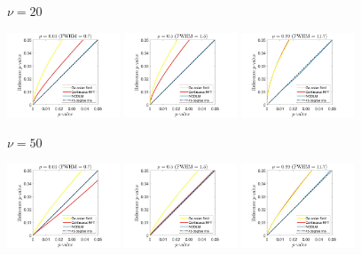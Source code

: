 \documentclass{article}
\begin{document}
\begin{figure}[!htp]
\centering
\begin{sideways}
\phantom{------------------}$\nu = 20$
\end{sideways}
\includegraphics[trim=70 5 100 5, clip,width=0.3\textwidth]{figure/2D_nu20_rho0.01.jpg}
\includegraphics[trim=70 5 100 5, clip,width=0.3\textwidth]{figure/2D_nu20_rho0.5.jpg}
\includegraphics[trim=70 5 100 5, clip,width=0.3\textwidth]{figure/2D_nu20_rho0.99.jpg}

\begin{sideways}
\phantom{------------------}$\nu = 50$
\end{sideways}
\includegraphics[trim=70 5 100 5, clip,width=0.3\textwidth]{figure/2D_nu50_rho0.01.jpg}
\includegraphics[trim=70 5 100 5, clip,width=0.3\textwidth]{figure/2D_nu50_rho0.5.jpg}
\includegraphics[trim=70 5 100 5, clip,width=0.3\textwidth]{figure/2D_nu50_rho0.99.jpg}


\end{figure}
\end{document}
